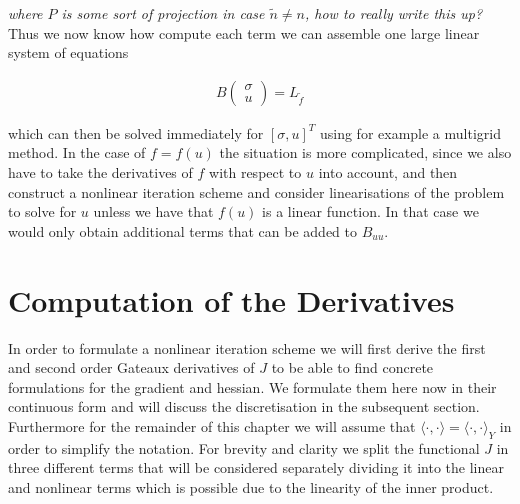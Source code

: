 \documentclass[../draft_1.tex]{subfiles}
\begin{document}
\textit{where $P$ is some sort of projection in case $\tilde{n} \neq n$, how to really write this up?} \\
Thus we now know how compute each term we can assemble one large linear system of equations
\begin{ceqn}
	\begin{align}
B
\begin{pmatrix}
\sigma \\
u
\end{pmatrix} = L_{\tilde{f}}
	\end{align}
\end{ceqn}
which can then be solved immediately for $[\sigma, u]^T$ using for example a multigrid method. In the case of $f = f(u)$ the situation is more complicated, since we also have to take the derivatives of $f$ with respect to $u$ into account, and then construct a nonlinear iteration scheme and consider linearisations of the problem to solve for $u$ unless we have that $f(u)$ is a linear function. In that case we would only obtain additional terms that can be added to $B_{uu}$. 


\section{Computation of the Derivatives}
In order to formulate a nonlinear iteration scheme we will first derive the first and second order Gateaux derivatives of $J$ to be able to find concrete formulations for the gradient and hessian. We formulate them here now in their continuous form and will discuss the discretisation in the subsequent section. Furthermore for the remainder of this chapter we will assume that $\langle \cdot, \cdot \rangle = \langle \cdot, \cdot \rangle _Y$ in order to simplify the notation. For brevity and clarity we split the functional $J$ in three different terms that will be considered separately dividing it into the linear and nonlinear terms which is possible due to the linearity of the inner product. 
\end{document}
